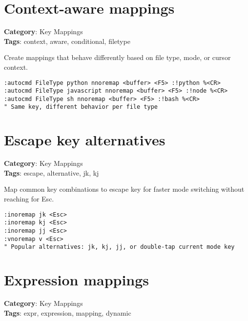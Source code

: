 \section{Context-aware mappings}

\textbf{Category}: Key Mappings\\ \textbf{Tags}: context, aware, conditional, filetype
\vspace{0.5cm}

Create mappings that behave differently based on file type, mode, or cursor context.

\begin{Exa*}{}
\begin{Verbatim}[fontsize=\footnotesize, breaklines, breakanywhere]
:autocmd FileType python nnoremap <buffer> <F5> :!python %<CR>
:autocmd FileType javascript nnoremap <buffer> <F5> :!node %<CR>
:autocmd FileType sh nnoremap <buffer> <F5> :!bash %<CR>
" Same key, different behavior per file type
\end{Verbatim}
\end{Exa*}

\section{Escape key alternatives}

\textbf{Category}: Key Mappings\\ \textbf{Tags}: escape, alternative, jk, kj
\vspace{0.5cm}

Map common key combinations to escape key for faster mode switching without reaching for Esc.

\begin{Exa*}{}
\begin{Verbatim}[fontsize=\footnotesize, breaklines, breakanywhere]
:inoremap jk <Esc>
:inoremap kj <Esc>
:inoremap jj <Esc>
:vnoremap v <Esc>
" Popular alternatives: jk, kj, jj, or double-tap current mode key
\end{Verbatim}
\end{Exa*}

\section{Expression mappings}

\textbf{Category}: Key Mappings\\ \textbf{Tags}: expr, expression, mapping, dynamic
\vspace{0.5cm}

